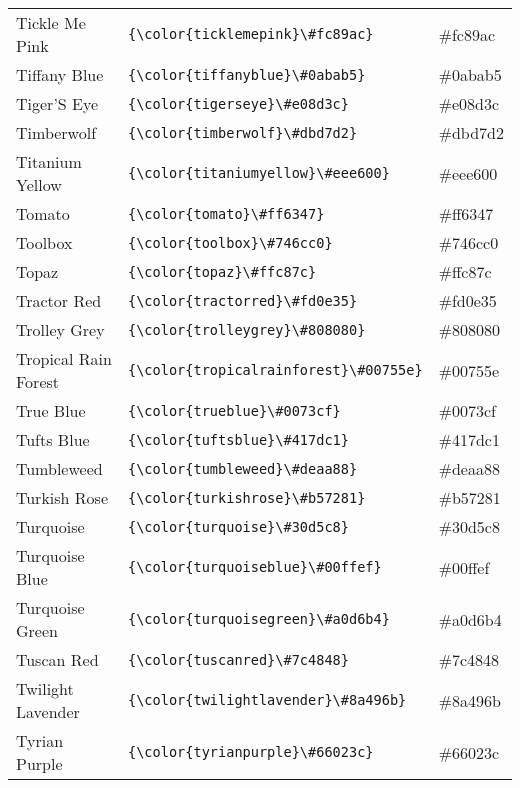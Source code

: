 \documentclass[9.5pt]{article}
\begin{document}
\begin{longtable}{l | l | l}
	Tickle Me Pink & \verb!{\color{ticklemepink}\#fc89ac}! & {\color{ticklemepink}\#fc89ac}\\
	Tiffany Blue & \verb!{\color{tiffanyblue}\#0abab5}! & {\color{tiffanyblue}\#0abab5}\\
	Tiger'S Eye & \verb!{\color{tigerseye}\#e08d3c}! & {\color{tigerseye}\#e08d3c}\\
	Timberwolf & \verb!{\color{timberwolf}\#dbd7d2}! & {\color{timberwolf}\#dbd7d2}\\
	Titanium Yellow & \verb!{\color{titaniumyellow}\#eee600}! & {\color{titaniumyellow}\#eee600}\\
	Tomato & \verb!{\color{tomato}\#ff6347}! & {\color{tomato}\#ff6347}\\
	Toolbox & \verb!{\color{toolbox}\#746cc0}! & {\color{toolbox}\#746cc0}\\
	Topaz & \verb!{\color{topaz}\#ffc87c}! & {\color{topaz}\#ffc87c}\\
	Tractor Red & \verb!{\color{tractorred}\#fd0e35}! & {\color{tractorred}\#fd0e35}\\
	Trolley Grey & \verb!{\color{trolleygrey}\#808080}! & {\color{trolleygrey}\#808080}\\
	Tropical Rain Forest & \verb!{\color{tropicalrainforest}\#00755e}! & {\color{tropicalrainforest}\#00755e}\\
	True Blue & \verb!{\color{trueblue}\#0073cf}! & {\color{trueblue}\#0073cf}\\
	Tufts Blue & \verb!{\color{tuftsblue}\#417dc1}! & {\color{tuftsblue}\#417dc1}\\
	Tumbleweed & \verb!{\color{tumbleweed}\#deaa88}! & {\color{tumbleweed}\#deaa88}\\
	Turkish Rose & \verb!{\color{turkishrose}\#b57281}! & {\color{turkishrose}\#b57281}\\
	Turquoise & \verb!{\color{turquoise}\#30d5c8}! & {\color{turquoise}\#30d5c8}\\
	Turquoise Blue & \verb!{\color{turquoiseblue}\#00ffef}! & {\color{turquoiseblue}\#00ffef}\\
	Turquoise Green & \verb!{\color{turquoisegreen}\#a0d6b4}! & {\color{turquoisegreen}\#a0d6b4}\\
	Tuscan Red & \verb!{\color{tuscanred}\#7c4848}! & {\color{tuscanred}\#7c4848}\\
	Twilight Lavender & \verb!{\color{twilightlavender}\#8a496b}! & {\color{twilightlavender}\#8a496b}\\
	Tyrian Purple & \verb!{\color{tyrianpurple}\#66023c}! & {\color{tyrianpurple}\#66023c}\\

\end{longtable}
\end{document}
